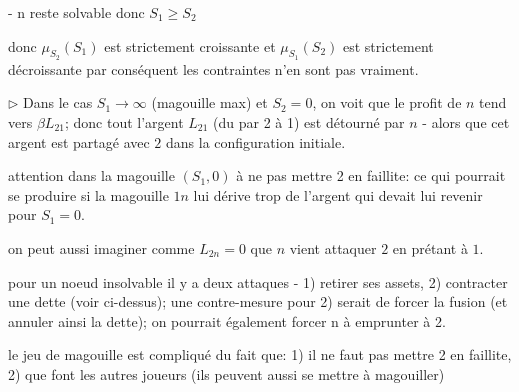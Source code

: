 \documentclass[11pt,oneside,twocolumn]{article}
\begin{document}
- n reste solvable donc $S_{1} \geq S_{2}$


donc $\mu_{S_{2}}(S_{1})$ est strictement croissante et $\mu_{S_{1}}(S_{2})$ est strictement décroissante par conséquent les contraintes n'en sont pas vraiment.


$\triangleright$
Dans le cas $S_1\to\infty$ (magouille max) et $S_2=0$, on voit que
le profit de $n$ tend vers $\beta L_{21}$; donc tout l'argent $L_{21}$ (du par 2 à 1) est détourné par $n$ - alors que cet argent est partagé avec $2$ dans la configuration initiale.

attention dans la magouille $(S_1,0)$ à ne pas mettre 2 en faillite:
ce qui pourrait se produire si la magouille $1n$
lui dérive trop de l'argent qui devait lui revenir pour $S_1=0$.

on peut aussi imaginer comme $L_{2n}=0$
que $n$ vient attaquer $2$ en prétant à $1$.

pour un noeud insolvable il y a deux attaques - 1) retirer ses assets, 2) contracter une dette (voir ci-dessus); une contre-mesure pour 2) serait de forcer la fusion (et annuler ainsi la dette); on pourrait également forcer n à emprunter à 2.

le jeu de magouille est compliqué du fait que: 1) il ne faut pas mettre 2 en faillite, 2) que font les autres joueurs (ils peuvent aussi se mettre à magouiller)
\end{document}
